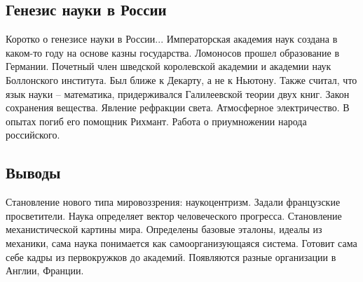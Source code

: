 \documentclass[a4paper, 12pt]{article}
\begin{document}

\subsection{Генезис науки в России}

Коротко о генезисе науки в России... Императорская академия наук создана 
в каком-то году на основе казны государства. Ломоносов прошел 
образование в Германии. Почетный член шведской королевской академии 
и академии наук Боллонского института. Был ближе к Декарту, а не 
к Ньютону. Также считал, что язык науки -- математика, придерживался 
Галилеевской теории двух книг. Закон сохранения вещества. Явление 
рефракции света. Атмосферное электричество. В опытах погиб его помощник 
Рихмант. Работа о приумножении народа российского.


\subsection{Выводы}

Становление нового типа мировоззрения: наукоцентризм. Задали французские 
просветители. Наука определяет вектор человеческого прогресса. 
Становление механистической картины мира. Определены базовые эталоны, 
идеалы из механики, сама наука понимается как самоорганизующаяся 
система. Готовит сама себе кадры из первокружков до академий. Появляются 
разные организации в Англии, Франции.
\end{document}
